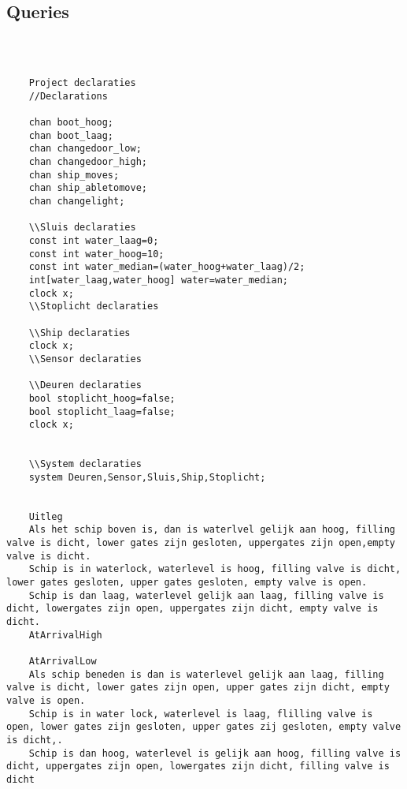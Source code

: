  
 \subsection{Queries}
 \begin{verbatim}
 	
 	
 	
 	Project declaraties
 	//Declarations
 	
 	chan boot_hoog;
 	chan boot_laag;
 	chan changedoor_low;
 	chan changedoor_high;
 	chan ship_moves;
 	chan ship_abletomove;
 	chan changelight;
 	
 	\\Sluis declaraties
 	const int water_laag=0;
 	const int water_hoog=10;
 	const int water_median=(water_hoog+water_laag)/2;
 	int[water_laag,water_hoog] water=water_median;
 	clock x;
 	\\Stoplicht declaraties
 	
 	\\Ship declaraties
 	clock x;
 	\\Sensor declaraties
 	
 	\\Deuren declaraties
 	bool stoplicht_hoog=false;
 	bool stoplicht_laag=false;
 	clock x;
 	
 	
 	\\System declaraties
 	system Deuren,Sensor,Sluis,Ship,Stoplicht;
 	
 	
 	Uitleg
 	Als het schip boven is, dan is waterlvel gelijk aan hoog, filling valve is dicht, lower gates zijn gesloten, uppergates zijn open,empty valve is dicht. 
 	Schip is in waterlock, waterlevel is hoog, filling valve is dicht, lower gates gesloten, upper gates gesloten, empty valve is open. 
 	Schip is dan laag, waterlevel gelijk aan laag, filling valve is dicht, lowergates zijn open, uppergates zijn dicht, empty valve is dicht.
 	AtArrivalHigh
 	
 	AtArrivalLow
 	Als schip beneden is dan is waterlevel gelijk aan laag, filling valve is dicht, lower gates zijn open, upper gates zijn dicht, empty valve is open. 
 	Schip is in water lock, waterlevel is laag, flilling valve is open, lower gates zijn gesloten, upper gates zij gesloten, empty valve is dicht,. 
 	Schip is dan hoog, waterlevel is gelijk aan hoog, filling valve is dicht, uppergates zijn open, lowergates zijn dicht, filling valve is dicht
 	
 	
 	
 \end{verbatim}
 
 
 
